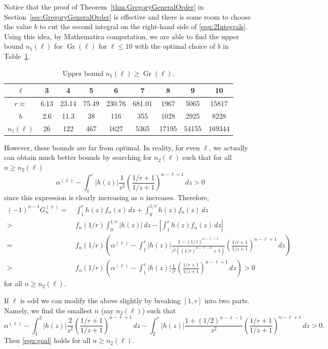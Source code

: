 \documentclass[11pt]{article}
\DeclareMathOperator{\Gr}{Gr}
\theoremstyle{plain}
\theoremstyle{definition}
\begin{document}
Notice that the proof of  Theorem~\ref{thm:GregoryGeneralOrder} in Section~\ref{sec:GregoryGeneralOrder} is effective and there is some room to choose the value $b$ to cut the second integral on the right-hand side of \eqref{equ:2Integrals}. Using this idea, by Mathematica computation, we are able to find the upper bound $n_1(\ell)$ for $\Gr(\ell)$ for $\ell\le 10$ with the optimal choice of $b$ in Table~\ref{tbl:n0bound}.
\begin{table}[h]
\centering\begin{tabular}{|c|c|c|c|c|c|c|c|c|}
\hline
$\ell$ &  3 & 4 & 5 & 6 & 7 & 8 & 9 & 10   \\
\hline
$r\approx$ &
6.13 & 23.14 & 75.49 & 230.76 & 681.01  & 1967 & 5065  & 15817    \\
\hline
$b$ & 2.6 & 11.3 & 38 & 116 & 355 &1028 & 2925 & 8228   \\
\hline
$n_1(\ell)$ &
26 & 122 & 467 & 1627 & 5365 & 17195 & 54155 & 169344    \\
\hline
\end{tabular}
\caption{Upper bound $n_1(\ell)\ge \Gr(\ell)$.}
\label{tbl:n0bound}
\end{table}

However, these bounds are far from optimal. In reality, for even $\ell$, we actually can obtain much better bounds by searching for $n_2(\ell)$
such that for all $n\ge n_2(\ell)$
\begin{equation*}
\alpha^{(\ell)} -  \int_1^{r} |h(z)|  \frac{1}{z^2}\left(\frac{1/r+1}{1/z+1}\right)^{n-\ell+1} \, dz  >0
\end{equation*}
since this expression is clearly increasing as $n$ increases. Therefore,
\begin{align*}
(-1)^{n-1} G_n^{(\ell)}=&\, \int_1^{r} h(z)  f_n(z)\, dz+\int_0^{1/r} h(z)  f_n(z)\, dz\\
>&\,   f_n(1/r) \int_0^{1/r} |h(z)| \, dz - \left| \int_1^r h(z) f_n(z)\, dz \right|  \\
= &\,f_n(1/r)\left(\alpha^{(\ell)}- \int_1^{r} |h(z)| \frac{1- (1/z)^{n-\ell-1}}{z^2((1/r)^{n-\ell-1}+1)}
    \left(\frac{1/r+1}{1/z+1}\right)^{n-\ell+1}  \, dz \right)\\
>&\, f_n(1/r)\left(\alpha^{(\ell)}- \int_1^{r} |h(z)| \frac{1}{z^2}
    \left(\frac{1/r+1}{1/z+1}\right)^{n-\ell+1}  \, dz \right)>0
\end{align*}
for all $n\ge n_2(\ell)$.

If $\ell$ is odd we can modify the above slightly by breaking $[1,r]$ into two parts.
Namely, we find the smallest $n$ (say $n_2(\ell)$) such that
\begin{equation*}
\alpha^{(\ell)} -  \int_1^2 |h(z)|  \frac{2}{z^2}\left(\frac{1/r+1}{1/z+1}\right)^{n-\ell+1} \, dz
-\int_2^{r} |h(z)|  \frac{1+(1/2)^{n-\ell-1}}{z^2}\left(\frac{1/r+1}{1/z+1}\right)^{n-\ell+1} \, dz  >0.
\end{equation*}
Then \eqref{equ:goal} holds for all $n\ge n_2(\ell)$.
\end{document}
